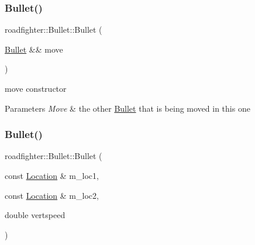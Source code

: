 \subsubsection{\texorpdfstring{Bullet()}{Bullet()}\hspace{0.1cm}{\footnotesize\ttfamily [3/4]}}
{\footnotesize\ttfamily roadfighter\+::\+Bullet\+::\+Bullet (\begin{DoxyParamCaption}\item[{\hyperlink{classroadfighter_1_1Bullet}{Bullet} \&\&}]{move }\end{DoxyParamCaption})\hspace{0.3cm}{\ttfamily [default]}}

move constructor 
\begin{DoxyParams}{Parameters}
{\em Move} & the other \hyperlink{classroadfighter_1_1Bullet}{Bullet} that is being moved in this one \\
\hline
\end{DoxyParams}
\mbox{\label{classroadfighter_1_1Bullet_a15ab9848b269b1ef463defbb6967deb0}} 
\subsubsection{\texorpdfstring{Bullet()}{Bullet()}\hspace{0.1cm}{\footnotesize\ttfamily [4/4]}}
{\footnotesize\ttfamily roadfighter\+::\+Bullet\+::\+Bullet (\begin{DoxyParamCaption}\item[{const \hyperlink{classroadfighter_1_1Location}{Location} \&}]{m\+\_\+loc1,  }\item[{const \hyperlink{classroadfighter_1_1Location}{Location} \&}]{m\+\_\+loc2,  }\item[{double}]{vertspeed }\end{DoxyParamCaption})}

